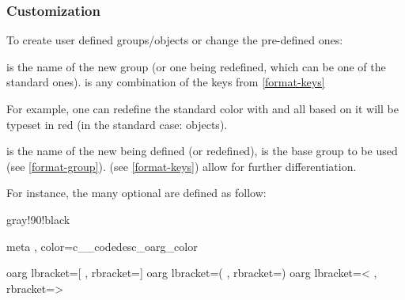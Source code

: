 \documentclass{article}
\begin{document}
  

\subsubsection{Customization}\label{format-custom}

To create  user defined groups/objects or change the pre-defined ones:


\begin{codedescribe}[code,new=2023/05/16]{}
\begin{codesyntax} %
\end{codesyntax}
 is the name of the new group (or one being redefined, which can be one of the standard ones).  is any combination of the keys from \ref{format-keys}
\end{codedescribe}

For example, one can redefine the  standard color with  and all  based on it will be typeset in red (in the standard case:  objects).



\begin{codedescribe}[code,new=2023/05/16]{}
\begin{codesyntax} %
\end{codesyntax}
 is the name of the new  being defined (or redefined),
 is the base group to be used (see \ref{format-group}).  (see \ref{format-keys}) allow for further differentiation.
\end{codedescribe}
For instance, the many optional  are defined as follow:
\begin{codestore}
 { gray!90!black }

 { meta , color=c__codedesc_oarg_color }

 {oarg} { lbracket={[} , rbracket={]} }
 {oarg} { lbracket={(} , rbracket={)} }
 {oarg} { lbracket={<} , rbracket={>} }
\end{codestore}
\end{document}
